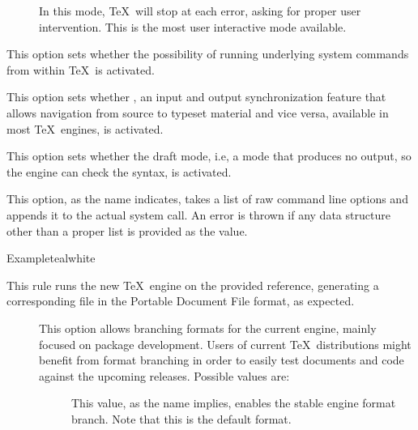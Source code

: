 \begin{description}
\begin{description}
\begin{description}
\item[] In this mode, \TeX\ will stop at each error, asking for proper user intervention. This is the most user interactive mode available.
\end{description}

\item[\rpsbox{shell}] This option sets whether the possibility of running underlying system commands from within \TeX\ is activated.

\item[\rpsbox{synctex}] This option sets whether , an input and output synchronization feature that allows navigation from source to typeset material and vice versa, available in most \TeX\ engines, is activated.

\item[\rpsbox{draft}] This option sets whether the draft mode, i.e, a mode that produces no output, so the engine can check the syntax, is activated.

\item[\abox{options}] This option, as the name indicates, takes a list of raw command line options and appends it to the actual system call. An error is thrown if any data structure other than a proper list is provided as the value.
\end{description}

\begin{codebox}{Example}{teal}{\icnote}{white}
\end{codebox}

\item[\rulebox{lualatex}]
This rule runs the new  \TeX\ engine on the provided  reference, generating a corresponding file in the Portable Document File format, as expected.

\begin{description}
\item[] This option allows branching formats for the current engine, mainly focused on package development. Users of current \TeX\ distributions might benefit from format branching in order to easily test documents and code against the upcoming releases. Possible values are:

\begin{description}
\item[] This value, as the name implies, enables the stable engine format branch. Note that this is the default format.


\end{description}
\end{description}
\end{description}
